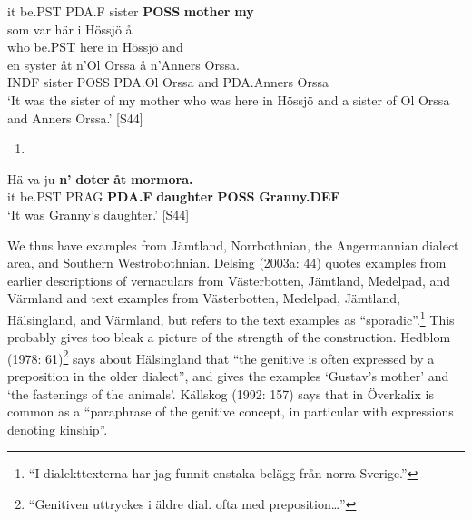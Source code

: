 it  be.PST  PDA.F  sister  \textbf{POSS} \textbf{mother} \textbf{my}\\ %


\ea\label{}
\gll som  var  här  i  Hössjö  å\\


who  be.PST  here  in  Hössjö  and\\ %


en  syster  åt  n’Ol  Orssa  å  n’Anners  Orssa.\\


INDF  sister   POSS  PDA.Ol  Orssa  and  PDA.Anners  Orssa\\ %


‘It was the sister of my mother who was here in Hössjö and a sister of Ol Orssa and Anners Orssa.’ [S44]
\z

\begin{enumerate} %
\item 
\end{enumerate} %
\ea\label{}
\gll Hä  va  ju  \textbf{n’} \textbf{doter} \textbf{åt} \textbf{mormora.}\\


it  be.PST  PRAG  \textbf{PDA.F} \textbf{daughter} \textbf{POSS} \textbf{Granny.DEF}\\ %


‘It was Granny’s daughter.’ [S44]
\z

We thus have examples from Jämtland, Norrbothnian, the Angermannian dialect area, and Southern Westrobothnian. Delsing (2003a: 44) quotes examples from earlier descriptions of vernaculars from Västerbotten, Jämtland, Medelpad, and Värmland and text examples from Västerbotten, Medelpad, Jämtland, Hälsingland, and Värmland, but refers to the text examples as “sporadic”.\footnote{ “I dialekttexterna har jag funnit enstaka belägg från norra Sverige.” } This probably gives too bleak a picture of the strength of the construction. Hedblom (1978: 61)\footnote{ “Genitiven uttryckes i äldre dial. ofta med preposition…” } says about Hälsingland that “the genitive is often expressed by a preposition in the older dialect”, and gives the examples  ‘Gustav’s mother’ and ‘the fastenings of the animals’. Källskog (1992: 157) says that in Överkalix  is common as a “paraphrase of the genitive concept, in particular with expressions denoting kinship”. 

